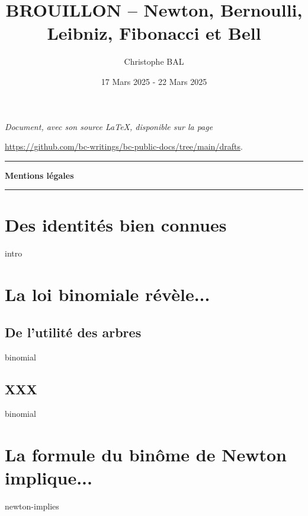 \documentclass[12pt]{amsart}
\begin{document}
\title{BROUILLON -- Newton, Bernoulli, Leibniz, Fibonacci et Bell}
\author{Christophe BAL}
\date{17 Mars 2025 - 22 Mars 2025}

\maketitle

\begin{center}
	\itshape
	Document, avec son source \LaTeX, disponible sur la page

	\url{https://github.com/bc-writings/bc-public-docs/tree/main/drafts}.
\end{center}


\bigskip


\begin{center}
	\hrule\vspace{.3em}
	{
		\fontsize{1.35em}{1em}\selectfont
		\textbf{Mentions \og légales \fg}
	}

	\vspace{0.45em}
	\doclicenseThis
	\hrule
\end{center}


\bigskip


\setcounter{tocdepth}{2}
\tableofcontents




\newpage

\section{Des identités bien connues}

{intro}




\section{La loi binomiale révèle...}

\subsection{De l'utilité des arbres}

{binomial}


\subsection{XXX}

{binomial}




\section{La formule du binôme de Newton implique...}

{newton-implies}
\end{document}
